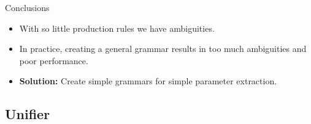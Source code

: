 \documentclass[11pt]{beamer}
\begin{document}
\begin{frame}
	\begin{block}{Conclusions}
		\begin{itemize}
			\item With so little production rules we have ambiguities.
			\pause
			\item In practice, creating a general grammar results in too much ambiguities and poor performance.
			\pause
			\item \textbf{Solution:} Create simple grammars for simple parameter extraction.
		\end{itemize}
	\end{block}
	\pause
\end{frame}

\subsection{Unifier}
\end{document}

